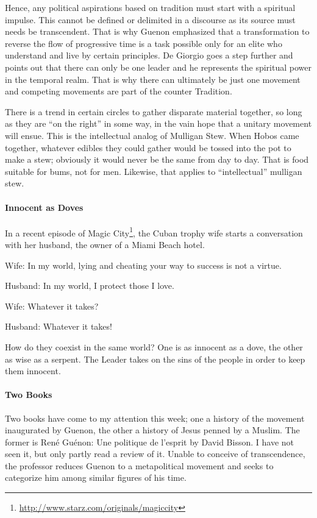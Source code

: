 Hence, any political aspirations based on tradition must start with a spiritual impulse. This cannot be defined or delimited in a discourse as its source must needs be transcendent. That is why Guenon emphasized that a transformation to reverse the flow of progressive time is a task possible only for an elite who understand and live by certain principles. De Giorgio goes a step further and points out that there can only be one leader and he represents the spiritual power in the temporal realm. That is why there can ultimately be just one movement and competing movements are part of the counter Tradition.

There is a trend in certain circles to gather disparate material together, so long as they are ``on the right'' in some way, in the vain hope that a unitary movement will ensue. This is the intellectual analog of Mulligan Stew. When Hobos came together, whatever edibles they could gather would be tossed into the pot to make a stew; obviously it would never be the same from day to day. That is food suitable for bums, not for men. Likewise, that applies to ``intellectual'' mulligan stew.

\paragraph{Innocent as Doves}


In a recent episode of Magic City\footnote{\url{http://www.starz.com/originals/magiccity}}, the Cuban trophy wife starts a conversation with her husband, the owner of a Miami Beach hotel.

Wife: In my world, lying and cheating your way to success is not a virtue.

Husband: In my world, I protect those I love.

Wife: Whatever it takes?

Husband: Whatever it takes!

How do they coexist in the same world? One is as innocent as a dove, the other as wise as a serpent. The Leader takes on the sins of the people in order to keep them innocent.

\paragraph{Two Books}


Two books have come to my attention this week; one a history of the movement inaugurated by Guenon, the other a history of Jesus penned by a Muslim. The former is René Guénon: Une politique de l'esprit by David Bisson. I have not seen it, but only partly read a review of it. Unable to conceive of transcendence, the professor reduces Guenon to a metapolitical movement and seeks to categorize him among similar figures of his time.

